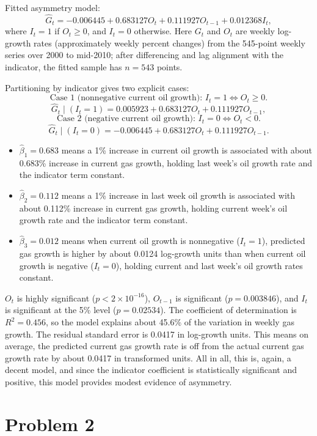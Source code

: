 \documentclass[
  10pt,
]{extarticle}
\providecommand{\tightlist}{%
  \setlength{\itemsep}{0pt}\setlength{\parskip}{0pt}}
\begin{document}
Fitted asymmetry model:
\[
\widehat G_t = -0.006445 + 0.683127 O_t + 0.111927 O_{t-1} + 0.012368 I_t,
\]
where \(I_t=1\) if \(O_t\ge 0\), and \(I_t=0\) otherwise. Here \(G_t\) and \(O_t\) are weekly log-growth rates (approximately weekly percent changes) from the 545-point weekly series over 2000 to mid-2010; after differencing and lag alignment with the indicator, the fitted sample has \(n=543\) points.

Partitioning by indicator gives two explicit cases:
\[
\text{Case 1 (nonnegative current oil growth): } I_t=1 \iff O_t\ge 0.
\]
\[
\widehat G_t \mid (I_t=1) = 0.005923 + 0.683127 O_t + 0.111927 O_{t-1},
\]
\[
\text{Case 2 (negative current oil growth): } I_t=0 \iff O_t<0.
\]
\[
\widehat G_t \mid (I_t=0) = -0.006445 + 0.683127 O_t + 0.111927 O_{t-1}.
\]

\begin{itemize}
\tightlist
\item
  \(\hat{\beta}_1=0.683\) means a 1\% increase in current oil growth is associated with about 0.683\% increase in current gas growth, holding last week's oil growth rate and the indicator term constant.
\item
  \(\hat{\beta}_2=0.112\) means a 1\% increase in last week oil growth is associated with about 0.112\% increase in current gas growth, holding current week's oil growth rate and the indicator term constant.
\item
  \(\hat{\beta}_3=0.012\) means when current oil growth is nonnegative (\(I_t=1\)), predicted gas growth is higher by about 0.0124 log-growth units than when current oil growth is negative (\(I_t=0\)), holding current and last week's oil growth rates constant.
\end{itemize}

\(O_t\) is highly significant (\(p < 2\times 10^{-16}\)), \(O_{t-1}\) is significant (\(p = 0.003846\)), and \(I_t\) is significant at the 5\% level (\(p = 0.02534\)). The coefficient of determination is \(R^2 = 0.456\), so the model explains about 45.6\% of the variation in weekly gas growth. The residual standard error is 0.0417 in log-growth units. This means on average, the predicted current gas growth rate is off from the actual current gas growth rate by about 0.0417 in transformed units. All in all, this is, again, a decent model, and since the indicator coefficient is statistically significant and positive, this model provides modest evidence of asymmetry.

\newpage

\section{Problem 2}\label{problem-2}
\end{document}
